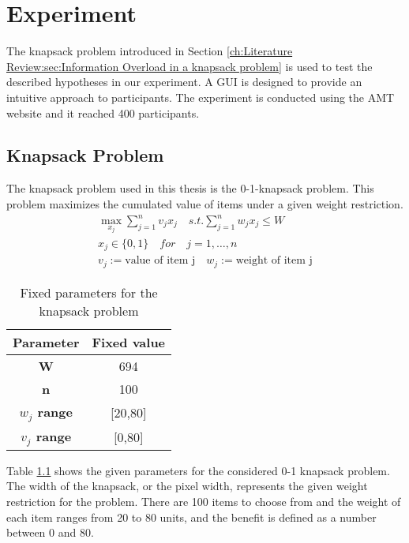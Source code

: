 
\chapter{Experiment}
\label{ch:Experiment}

The knapsack problem introduced in Section \ref{ch:Literature Review:sec:Information Overload in a knapsack problem} is used to test the described hypotheses in our experiment. A \ac{GUI} is designed to provide an intuitive approach to participants. The experiment is conducted using the \ac{AMT} website and it reached 400 participants.

\section{Knapsack Problem}
\label{ch:Experiment:sec:Knapsack}

The knapsack problem used in this thesis is the 0-1-knapsack problem. This problem maximizes the cumulated value of items under a given weight restriction.
\begin{equation}
\begin{split}
\max\limits_{x_j} \sum_{j=1}^{n} v_j x_j \quad
s.t. \sum_{j=1}^{n} w_j x_j \leq W \quad \\
x_j \in \{0,1\} \quad for \quad j = 1, \dots, n \\
v_j := \text{value of item j} \quad w_j := \text{weight of item j}
\end{split}
\end{equation}
\begin{table}[b] %
  \centering
    \begin{tabular}{c|c}
    \textbf{Parameter} & \multicolumn{1}{c}{\textbf{Fixed value}} \bigstrut[b]\\
    \hline
    \textbf{W} & 694 \bigstrut\\
    \hline
    \textbf{n} & 100 \bigstrut\\
    \hline
    \textbf{$w_j$ range} & \multicolumn{1}{c}{[20,80]} \bigstrut\\
    \hline
    \textbf{$v_j$ range} & \multicolumn{1}{c}{[0,80]} \bigstrut\\
    \hline
    \end{tabular}%
  \caption{Fixed parameters for the knapsack problem}
    \label{tab:KnapsackParamters}
\end{table}%
Table \ref{tab:KnapsackParamters} shows the given parameters for the considered 0-1 knapsack problem. The width of the knapsack, or the pixel width, represents the given weight restriction for the problem. There are 100 items to choose from and the weight of each item ranges from 20 to 80 units, and the benefit is defined as a number between 0 and 80.

